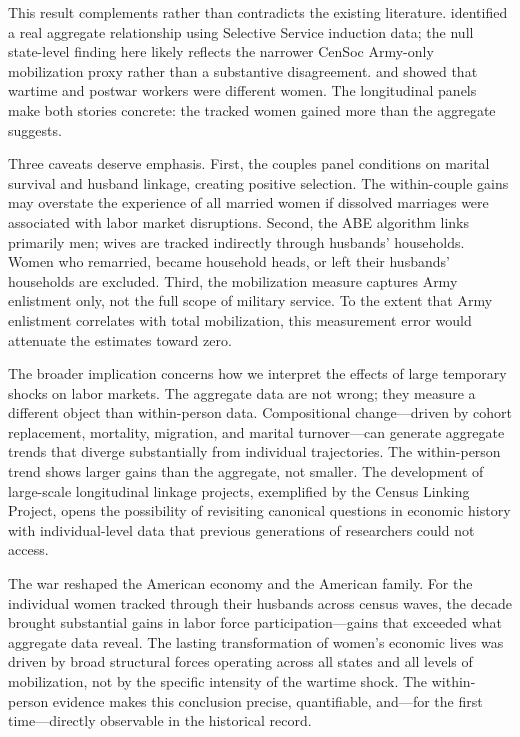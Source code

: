 \documentclass[12pt]{article}
\begin{document}
This result complements rather than contradicts the existing literature. \citet{acemoglu2004women} identified a real aggregate relationship using Selective Service induction data; the null state-level finding here likely reflects the narrower CenSoc Army-only mobilization proxy rather than a substantive disagreement. \citet{goldin1991role} and \citet{rose2018rise} showed that wartime and postwar workers were different women. The longitudinal panels make both stories concrete: the tracked women gained more than the aggregate suggests.

Three caveats deserve emphasis. First, the couples panel conditions on marital survival and husband linkage, creating positive selection. The within-couple gains may overstate the experience of all married women if dissolved marriages were associated with labor market disruptions. Second, the ABE algorithm links primarily men; wives are tracked indirectly through husbands' households. Women who remarried, became household heads, or left their husbands' households are excluded. Third, the mobilization measure captures Army enlistment only, not the full scope of military service. To the extent that Army enlistment correlates with total mobilization, this measurement error would attenuate the estimates toward zero.

The broader implication concerns how we interpret the effects of large temporary shocks on labor markets. The aggregate data are not wrong; they measure a different object than within-person data. Compositional change---driven by cohort replacement, mortality, migration, and marital turnover---can generate aggregate trends that diverge substantially from individual trajectories. The within-person trend shows larger gains than the aggregate, not smaller. The development of large-scale longitudinal linkage projects, exemplified by the Census Linking Project, opens the possibility of revisiting canonical questions in economic history with individual-level data that previous generations of researchers could not access.

The war reshaped the American economy and the American family. For the individual women tracked through their husbands across census waves, the decade brought substantial gains in labor force participation---gains that exceeded what aggregate data reveal. The lasting transformation of women's economic lives was driven by broad structural forces operating across all states and all levels of mobilization, not by the specific intensity of the wartime shock. The within-person evidence makes this conclusion precise, quantifiable, and---for the first time---directly observable in the historical record.
\end{document}
